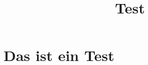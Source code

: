 \documentclass[]{article}
\title{Test}
\author{}
\begin{document}
\maketitle

\begin{abstract}

\end{abstract}

\section{Das ist ein Test}
\end{document}
